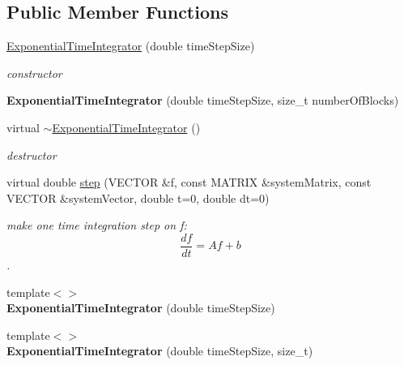 \subsection*{Public Member Functions}
\begin{DoxyCompactItemize}
\item 
\hypertarget{classnatrium_1_1ExponentialTimeIntegrator_a3a3e7b0c53b5c083dbdb7b3d625d8087}{
\hyperlink{classnatrium_1_1ExponentialTimeIntegrator_a3a3e7b0c53b5c083dbdb7b3d625d8087}{ExponentialTimeIntegrator} (double timeStepSize)}
\label{classnatrium_1_1ExponentialTimeIntegrator_a3a3e7b0c53b5c083dbdb7b3d625d8087}

\begin{DoxyCompactList}\small\item\em constructor \item\end{DoxyCompactList}\item 
\hypertarget{classnatrium_1_1ExponentialTimeIntegrator_a7da2892aead7c5e1fec82be549dcb37b}{
{\bfseries ExponentialTimeIntegrator} (double timeStepSize, size\_\-t numberOfBlocks)}
\label{classnatrium_1_1ExponentialTimeIntegrator_a7da2892aead7c5e1fec82be549dcb37b}

\item 
\hypertarget{classnatrium_1_1ExponentialTimeIntegrator_ad85e62117ec3dbfebfbccd6ad1135d8c}{
virtual \hyperlink{classnatrium_1_1ExponentialTimeIntegrator_ad85e62117ec3dbfebfbccd6ad1135d8c}{$\sim$ExponentialTimeIntegrator} ()}
\label{classnatrium_1_1ExponentialTimeIntegrator_ad85e62117ec3dbfebfbccd6ad1135d8c}

\begin{DoxyCompactList}\small\item\em destructor \item\end{DoxyCompactList}\item 
virtual double \hyperlink{classnatrium_1_1ExponentialTimeIntegrator_ae0a9cff9bdafab123016db72d1439ef8}{step} (VECTOR \&f, const MATRIX \&systemMatrix, const VECTOR \&systemVector, double t=0, double dt=0)
\begin{DoxyCompactList}\small\item\em make one time integration step on f: \[ \frac{df}{dt} = Af+b \]. \item\end{DoxyCompactList}\item 
\hypertarget{classnatrium_1_1ExponentialTimeIntegrator_a7b68727897acae02ff025c39a56a4bf6}{
{\footnotesize template$<$$>$ }\\{\bfseries ExponentialTimeIntegrator} (double timeStepSize)}
\label{classnatrium_1_1ExponentialTimeIntegrator_a7b68727897acae02ff025c39a56a4bf6}

\item 
\hypertarget{classnatrium_1_1ExponentialTimeIntegrator_acbd606f38f9c5c0b4cb9b9fc817f1186}{
{\footnotesize template$<$$>$ }\\{\bfseries ExponentialTimeIntegrator} (double timeStepSize, size\_\-t)}
\label{classnatrium_1_1ExponentialTimeIntegrator_acbd606f38f9c5c0b4cb9b9fc817f1186}

\end{DoxyCompactItemize}


